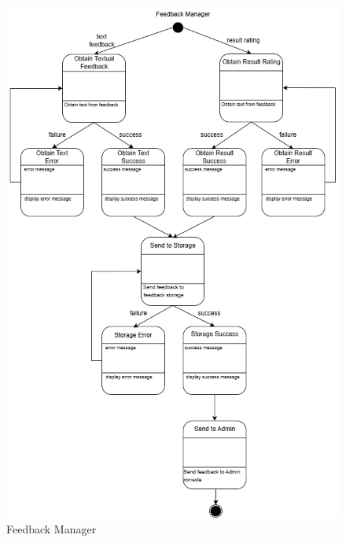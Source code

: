 \begin{figure}[H]
	\centering
	\includegraphics[width=\linewidth]{Section2/feedback_manager_state_diagram.png}
	\caption{Feedback Manager}
	\label{FeedbackManager}
\end{figure}